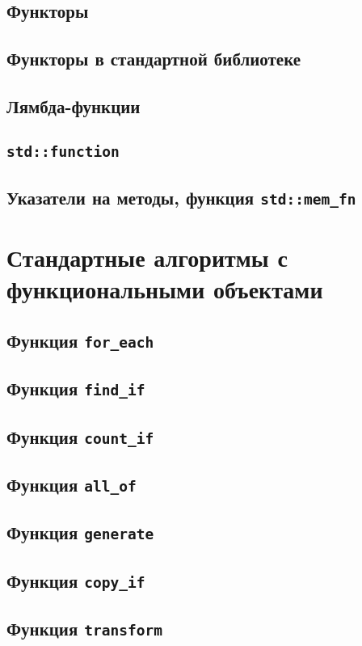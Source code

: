 \documentclass{article}
\begin{document}
\subsection*{Функторы}
\subsection*{Функторы в стандартной библиотеке}
\subsection*{Лямбда-функции}
\subsection*{\texttt{std::function}}
\subsection*{Указатели на методы, функция \texttt{std::mem\_fn}}


\newpage
\section*{Стандартные алгоритмы с функциональными объектами}


\subsection*{Функция \texttt{for\_each}}
\subsection*{Функция \texttt{find\_if}}
\subsection*{Функция \texttt{count\_if}}
\subsection*{Функция \texttt{all\_of}}
\subsection*{Функция \texttt{generate}}
\subsection*{Функция \texttt{copy\_if}}
\subsection*{Функция \texttt{transform}}
\end{document}

